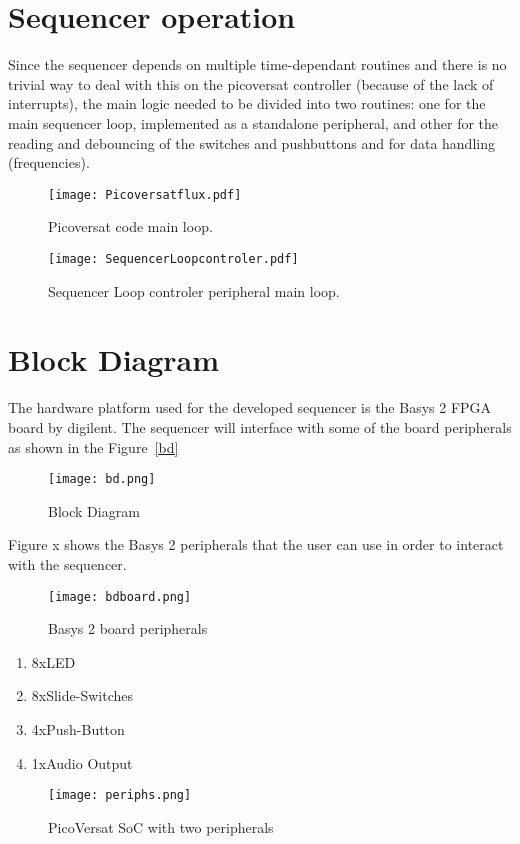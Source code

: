 
\section{Sequencer operation}

Since the sequencer depends on multiple time-dependant routines and there is no trivial way to deal with this on the picoversat controller (because of the lack of interrupts), the main logic needed to be divided into two routines: one for the main sequencer loop, implemented as a standalone peripheral, and other for the reading and debouncing of the switches and pushbuttons and for data handling (frequencies).

\begin{figure}[!htbp]
  \centerline{\texttt{[image: Picoversatflux.pdf]}}
  \vspace{0cm}\caption{Picoversat code main loop.}
  \label{fig:bd}
\end{figure}

\begin{figure}[!htbp]
  \centerline{\texttt{[image: SequencerLoopcontroler.pdf]}}
  \vspace{0cm}\caption{Sequencer Loop controler peripheral main loop.}
  \label{fig:bd}
\end{figure}



\section{Block Diagram}

The hardware platform used for the developed sequencer is the Basys 2 FPGA board by digilent. The sequencer will interface with some of the board peripherals as shown in the Figure~\ref{bd} 

\begin{figure}[!htbp]
    \centerline{\texttt{[image: bd.png]}}
    \vspace{0cm}\caption{Block Diagram}
    \label{fig:bd}
\end{figure}

Figure x shows the Basys 2 peripherals that the user can use in order to interact with the sequencer.

\begin{figure}[!htbp]
  \centerline{\texttt{[image: bdboard.png]}}
  \vspace{0cm}\caption{Basys 2 board peripherals}
  \label{fig:bd}
\end{figure}

\begin{enumerate}
	\item 8xLED
	\item 8xSlide-Switches
	\item 4xPush-Button
	\item 1xAudio Output
\end{enumerate}




\begin{figure}[!htbp]
    \centerline{\texttt{[image: periphs.png]}}
    \vspace{0cm}\caption{PicoVersat SoC with two peripherals}
    \label{fig:periphs}
\end{figure}